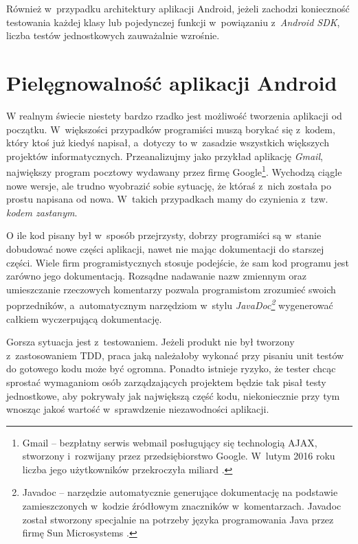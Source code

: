 Również w~przypadku architektury aplikacji Android, jeżeli zachodzi konieczność testowania każdej klasy lub pojedynczej funkcji w~powiązaniu z~\textit{Android SDK}, liczba testów jednostkowych zauważalnie wzrośnie.

\section{Pielęgnowalność aplikacji Android}
\label{pielegnowalnosc_aplikacji}
W realnym świecie niestety bardzo rzadko jest możliwość tworzenia aplikacji od początku. W~większości przypadków programiści muszą borykać się z~kodem, który ktoś już kiedyś napisał, a~dotyczy to w~zasadzie wszystkich większych projektów informatycznych. Przeanalizujmy jako przykład  aplikację \textit{Gmail}, największy program pocztowy wydawany przez firmę Google\footnote{Gmail – bezpłatny serwis webmail posługujący się technologią AJAX, stworzony i~rozwijany przez przedsiębiorstwo Google. W~lutym 2016 roku liczba jego użytkowników przekroczyła miliard \cite{website:wikipedia}.}. Wychodzą ciągle nowe wersje, ale trudno wyobrazić sobie sytuację, że któraś z~nich została po prostu napisana od nowa. W~takich przypadkach mamy do czynienia z~tzw. \textit{kodem zastanym}.

O ile kod pisany był w~sposób przejrzysty, dobrzy programiści są w~stanie dobudować nowe części aplikacji, nawet nie mając dokumentacji do starszej części. Wiele firm programistycznych stosuje podejście, że sam kod programu jest zarówno jego dokumentacją. Rozsądne nadawanie nazw zmiennym oraz umieszczanie rzeczowych komentarzy pozwala programistom zrozumieć swoich poprzedników, a~automatycznym narzędziom w~stylu \textit{JavaDoc\footnote{Javadoc – narzędzie automatycznie generujące dokumentację na podstawie zamieszczonych w~kodzie źródłowym znaczników w~komentarzach. Javadoc został stworzony specjalnie na potrzeby języka programowania Java przez firmę Sun Microsystems \cite{website:wikipedia}.}} wygenerować całkiem wyczerpującą dokumentację.

Gorsza sytuacja jest z~testowaniem. Jeżeli produkt nie był tworzony z~zastosowaniem TDD, praca jaką należałoby wykonać przy pisaniu unit testów do gotowego kodu może być ogromna. Ponadto istnieje ryzyko, że tester chcąc sprostać wymaganiom osób zarządzających projektem będzie tak pisał testy jednostkowe, aby pokrywały jak największą część kodu, niekoniecznie przy tym wnosząc jakoś wartość w~sprawdzenie niezawodności aplikacji.

